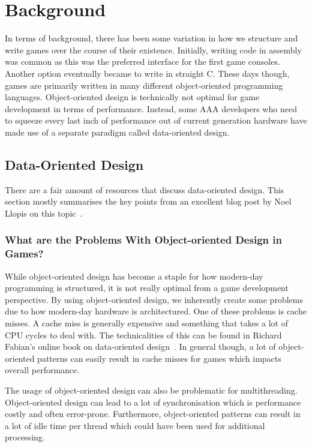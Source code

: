 \chapter{Background}
In terms of background, there has been some variation in how we structure and write games over the course of their existence. Initially, writing code in assembly was common as this was the preferred interface for the first game consoles. Another option eventually became to write in straight C. These days though, games are primarily written in many different object-oriented programming languages. Object-oriented design is technically not optimal for game development in terms of performance. Instead, some AAA developers who need to squeeze every last inch of performance out of current generation hardware have made use of a separate paradigm called data-oriented design. 

\section{Data-Oriented Design}
There are a fair amount of resources that discuss data-oriented design. This section mostly summarises the key points from an excellent blog post by Noel Llopis on this topic~\cite{noelDOD}.

\subsection{What are the Problems With Object-oriented Design in Games?}
While object-oriented design has become a staple for how modern-day programming is structured, it is not really optimal from a game development perspective. By using object-oriented design, we inherently create some problems due to how modern-day hardware is architectured. One of these problems is cache misses. A cache miss is generally expensive and something that takes a lot of CPU cycles to deal with. The technicalities of this can be found in Richard Fabian's online book on data-oriented design~\cite{fabiancache}. In general though, a lot of object-oriented patterns can easily result in cache misses for games which impacts overall performance. 

The usage of object-oriented design can also be problematic for multithreading. Object-oriented design can lead to a lot of synchronisation which is performance costly and often error-prone. Furthermore, object-oriented patterns can result in a lot of idle time per thread which could have been used for additional processing. 

